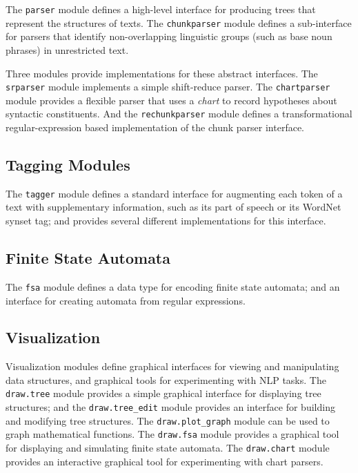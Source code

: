 \documentclass[11pt]{article}
\begin{document}
The \texttt{parser} module defines a high-level interface for
producing trees that represent the structures of texts.  The
\texttt{chunkparser} module defines a sub-interface for parsers that
identify non-overlapping linguistic groups (such as base noun phrases)
in unrestricted text.

Three modules provide implementations for these abstract interfaces.
The \texttt{srparser} module implements a simple shift-reduce parser.
The \texttt{chartparser} module provides a flexible parser that uses a
\emph{chart} to record hypotheses about syntactic constituents.  And
the \texttt{rechunkparser} module defines a transformational
regular-expression based implementation of the chunk parser interface.

\subsection*{Tagging Modules}

The \texttt{tagger} module defines a standard interface for augmenting
each token of a text with supplementary information, such as its part
of speech or its WordNet synset tag; and provides several different
implementations for this interface.

\subsection*{Finite State Automata}

The \texttt{fsa} module defines a data type for encoding finite state
automata; and an interface for creating automata from regular
expressions.

\subsection*{Visualization}


Visualization modules define graphical interfaces for viewing and
manipulating data structures, and graphical tools for experimenting
with NLP tasks.  The \texttt{draw.tree} module provides a simple
graphical interface for displaying tree structures; and the
\texttt{draw.tree\_edit} module provides an interface for building and
modifying tree structures.  The \texttt{draw.plot\_graph} module can be
used to graph mathematical functions.  The \texttt{draw.fsa} module
provides a graphical tool for displaying and simulating finite state
automata.  The \texttt{draw.chart} module provides an interactive
graphical tool for experimenting with chart parsers.
\end{document}
